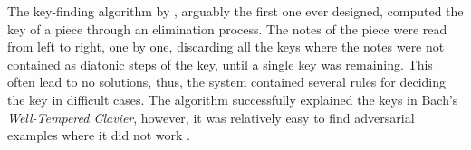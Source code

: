 


The key-finding algorithm by
\textcite{longuethiggins1971interpreting}, arguably the
first one ever designed, computed the key of a piece through
an elimination process. The notes of the piece were read
from left to right, one by one, discarding all the keys
where the notes were not contained as diatonic steps of the
key, until a single key was remaining. This often lead to no
solutions, thus, the system contained several rules for
deciding the key in difficult cases. The algorithm
successfully explained the keys in Bach's
\emph{Well-Tempered Clavier}, however, it was relatively
easy to find adversarial examples where it did not work
\parencite{temperley2008pitchclass}.


